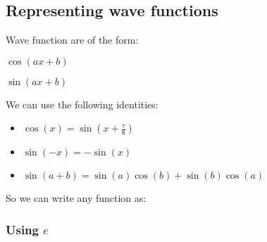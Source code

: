 
\subsection{Representing wave functions}

Wave function are of the form:

\(\cos(ax + b)\)

\(\sin(ax + b)\)

We can use the following identities:

\begin{itemize}
\item \(\cos(x)=\sin(x+\frac{\tau }{8})\)
\item \(\sin(-x)=-\sin(x)\)
\item \(\sin(a+b)=\sin(a)\cos(b)+\sin(b)\cos(a)\)
\end{itemize}

So we can write any function as:

\subsubsection{Using \(e\)}


